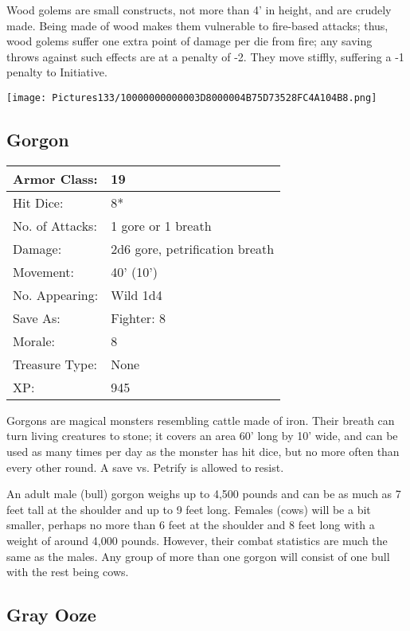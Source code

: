 \documentclass[a4paper,twoside,openany,10pt]{book}
\begin{document}
\begin{multicols}{2}
Wood golems are small constructs, not more than 4' in height, and are crudely made. Being made of wood makes them vulnerable to fire-based attacks; thus, wood golems suffer one extra point of damage per die from fire; any saving throws against such effects are at a penalty of -2. They move stiffly, suffering a -1 penalty to Initiative.

\begin{center}
	\texttt{[image: Pictures133/10000000000003D8000004B75D73528FC4A104B8.png]}
\end{center}

\subsection*{Gorgon}\label{gorgon}

\begin{tabularx}{0.48\textwidth}{@{}lX@{}}
Armor Class: & 19 \\\hline
Hit Dice: & 8* \\\hline
No. of Attacks: & 1 gore or 1 breath \\\hline
Damage: & 2d6 gore, petrification breath \\\hline
Movement: & 40' (10') \\\hline
No. Appearing: & Wild 1d4 \\\hline
Save As: & Fighter: 8 \\\hline
Morale: & 8 \\\hline
Treasure Type: & None \\\hline
XP: & 945 \\\hline
\end{tabularx}\medskip

Gorgons are magical monsters resembling cattle made of iron. Their breath can turn living creatures to stone; it covers an area 60' long by 10' wide, and can be used as many times per day as the monster has hit dice, but no more often than every other round. A save vs. Petrify is allowed to resist. 

An adult male (bull) gorgon weighs up to 4,500 pounds and can be as much as 7 feet tall at the shoulder and up to 9 feet long. Females (cows) will be a bit smaller, perhaps no more than 6 feet at the shoulder and 8 feet long with a weight of around 4,000 pounds. However, their combat statistics are much the same as the males. Any group of more than one gorgon will consist of one bull with the rest being cows.

\subsection*{Gray Ooze}\label{gray-ooze}


\end{multicols}
\end{document}
